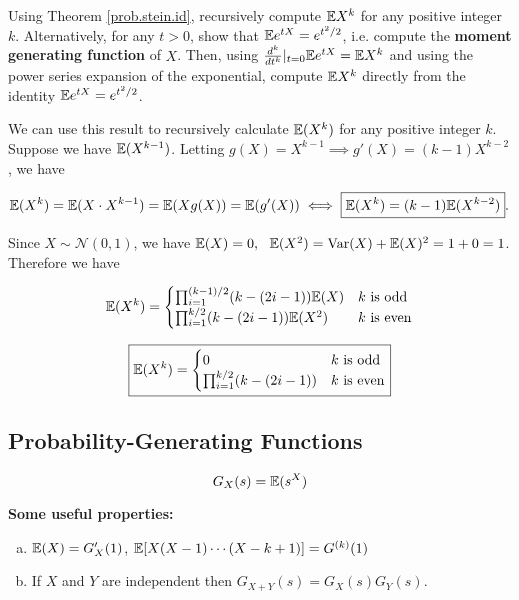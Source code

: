 \begin{example} Using Theorem \ref{prob.stein.id}, recursively compute $\mathbb{E} X^{k}$ for any positive integer $k$. Alternatively, for any $t>0$, show that $\mathbb{E} e^{tX}=e^{t^{2}/2}$, i.e. compute the \textbf{moment generating function} of $X$.  Then, using $\frac{d^{k}}{dt^{k}}|_{t=0}\mathbb{E} e^{tX}=\mathbb{E} X^{k}$ and using the power series expansion of the exponential, compute $\mathbb{E} X^{k}$ directly from the identity $\mathbb{E} e^{tX}=e^{t^{2}/2}$.

\begin{solution} We can use this result to recursively calculate \(\mathbb{E}(X^k)\) for any positive integer \(k\). Suppose we have \(\mathbb{E}(X^{k-1})\). Letting \(g(X) = X^{k-1} \implies g'(X) = (k-1)X^{k-2}\), we have 

\[
\mathbb{E}(X^k) = \mathbb{E}(X \cdot X^{k-1}) = \mathbb{E}(X g(X)) = \mathbb{E}(g'(X)) \iff \boxed{\mathbb{E}(X^k) = (k-1)\mathbb{E}(X^{k-2})}.
\]

Since \(X \sim \mathcal{N}(0,1)\), we have \(\mathbb{E}(X)=0, \ \ \mathbb{E}(X^2) = \mathrm{Var}(X) + \mathbb{E}(X)^2 = 1 + 0 = 1\). Therefore we have

\[
\mathbb{E}(X^k) = \begin{cases} \prod_{i=1}^{(k-1)/2} (k-(2i-1)) \mathbb{E}(X) & k \text{ is odd} \\
 \prod_{i=1}^{k/2} (k-(2i-1)) \mathbb{E}(X^2) & k \text{ is even} \end{cases}
\]

\[
\boxed{
\mathbb{E}(X^k) = \begin{cases} 0& k \text{ is odd} \\
 \prod_{i=1}^{k/2} (k-(2i-1))  & k \text{ is even} \end{cases}}
\]

\end{solution}

\end{example}


\subsection{Probability-Generating Functions}

\begin{definition}

\[
G_X(s) = \mathbb{E}(s^X) 
\]

\end{definition}

\begin{theorem} \textbf{Some useful properties:}

\begin{enumerate}[(a)]

\item \(\mathbb{E}(X) = G_X'(1)\), \(\mathbb{E}[X(X-1)\cdots(X - k +1)] = G^{(k)}(1)\)

\item If \(X\) and \(Y\) are independent then \(G_{X +Y}(s) = G_X(s) G_Y(s)\).

\end{enumerate}
\end{theorem}

